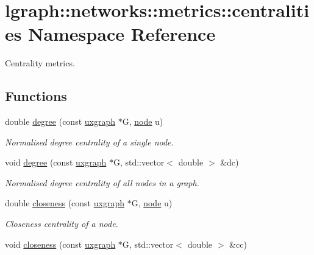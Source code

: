 \hypertarget{namespacelgraph_1_1networks_1_1metrics_1_1centralities}{\section{lgraph\-:\-:networks\-:\-:metrics\-:\-:centralities Namespace Reference}
\label{namespacelgraph_1_1networks_1_1metrics_1_1centralities}
}


Centrality metrics.  


\subsection*{Functions}
\begin{DoxyCompactItemize}
\item 
double \hyperlink{namespacelgraph_1_1networks_1_1metrics_1_1centralities_a059db418660d28d673a154ceef293469}{degree} (const \hyperlink{classlgraph_1_1uxgraph}{uxgraph} $\ast$G, \hyperlink{namespacelgraph_a397169dd66adf725210a30fb7251773e}{node} u)
\begin{DoxyCompactList}\small\item\em Normalised degree centrality of a single node. \end{DoxyCompactList}\item 
void \hyperlink{namespacelgraph_1_1networks_1_1metrics_1_1centralities_a371fb57a5a7b42017baa3ef52a9e28a6}{degree} (const \hyperlink{classlgraph_1_1uxgraph}{uxgraph} $\ast$G, std\-::vector$<$ double $>$ \&dc)
\begin{DoxyCompactList}\small\item\em Normalised degree centrality of all nodes in a graph. \end{DoxyCompactList}\item 
double \hyperlink{namespacelgraph_1_1networks_1_1metrics_1_1centralities_a5e567539ccb6396bfb47ba2173a0cc4c}{closeness} (const \hyperlink{classlgraph_1_1uxgraph}{uxgraph} $\ast$G, \hyperlink{namespacelgraph_a397169dd66adf725210a30fb7251773e}{node} u)
\begin{DoxyCompactList}\small\item\em Closeness centrality of a node. \end{DoxyCompactList}\item 
void \hyperlink{namespacelgraph_1_1networks_1_1metrics_1_1centralities_aa7252de7745ee93430ddef0b64643077}{closeness} (const \hyperlink{classlgraph_1_1uxgraph}{uxgraph} $\ast$G, std\-::vector$<$ double $>$ \&cc)

\end{DoxyCompactItemize}
